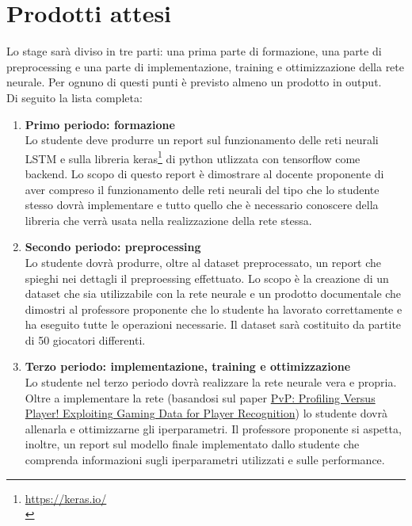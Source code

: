\section*{Prodotti attesi}
Lo stage sarà diviso in tre parti: una prima parte di formazione, una parte di preprocessing e una parte di implementazione, training e ottimizzazione della rete neurale. Per ognuno di questi punti è previsto almeno un prodotto in output.\\
Di seguito la lista completa:
\begin{enumerate}
    \item \textbf{Primo periodo: formazione} \\
		Lo studente deve produrre un report sul funzionamento delle reti neurali LSTM e sulla libreria keras\footnote{\href{https://keras.io/}{https://keras.io/} \\} di python utlizzata con tensorflow come backend. Lo scopo di questo report è dimostrare al docente proponente di aver compreso 
		il funzionamento delle reti neurali del tipo che lo studente stesso dovrà implementare e tutto quello che è necessario conoscere della libreria che verrà usata nella realizzazione della rete stessa. 
    
    \item \textbf{Secondo periodo: preprocessing} \\
		Lo studente dovrà produrre, oltre al dataset preprocessato, un report che spieghi nei dettagli il preproessing effettuato. Lo scopo è la creazione di un dataset che sia utilizzabile con la rete neurale e un prodotto 
		documentale che dimostri al professore proponente che lo studente ha lavorato correttamente e ha eseguito tutte le operazioni necessarie. Il dataset sarà costituito da partite di 50 giocatori differenti.
    
    \item \textbf{Terzo periodo: implementazione, training e ottimizzazione}\\	
		Lo studente nel terzo periodo dovrà realizzare la rete neurale vera e propria. Oltre a implementare la rete (basandosi sul paper 
		\href{https://link.springer.com/chapter/10.1007/978-3-030-62974-8_22}{PvP: Profiling Versus Player! Exploiting Gaming Data for Player Recognition})
		lo studente dovrà allenarla e ottimizzarne gli iperparametri. Il professore proponente si aspetta, inoltre, un report sul modello finale implementato 
		dallo studente che comprenda informazioni sugli iperparametri utilizzati e sulle performance.
    
\end{enumerate}


 
